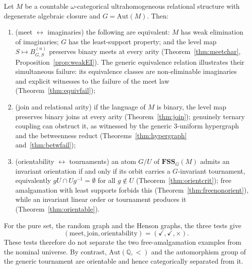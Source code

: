 \documentclass{lmcs}
\newcommand{\Aut}{\mathrm{Aut}}
\newcommand{\FSS}{\mathbf{FSS}}
\begin{document}
\begin{rem}\label{prop:dictionary}
Let $M$ be a countable $\omega$-categorical ultrahomogeneous relational
structure with degenerate algebraic closure and $G=\Aut(M)$. Then:
\begin{enumerate}[label=\textup{(\alph*)}]
\item \textup{(meet $\leftrightarrow$ imaginaries)} the following are
equivalent: $M$ has weak elimination of imaginaries; $G$ has the
least-support property; and the level map
$S\mapsto B^{(n)}_{G,S}$ preserves binary meets at every arity
\textup{(Theorem~\ref{thm:meetchar}, Proposition~\ref{prop:weakEI})}.
The generic equivalence relation illustrates their simultaneous
failure: its equivalence classes are non-eliminable imaginaries and
explicit witnesses to the failure of the meet law
\textup{(Theorem~\ref{thm:equivfail})};
\item \textup{(join and relational arity)} if the language of $M$
is binary, the level map preserves binary joins at every arity
\textup{(Theorem~\ref{thm:join})}; genuinely ternary coupling can
obstruct it, as witnessed by the generic $3$-uniform hypergraph and
the betweenness reduct
\textup{(Theorems~\ref{thm:hypergraph} and~\ref{thm:betwfail})};
\item \textup{(orientability $\leftrightarrow$ tournaments)} an atom
$G/U$ of $\FSS_G(M)$ admits an invariant orientation if and only if
its orbit carries a $G$-invariant tournament, equivalently
$gU\cap Ug^{-1}=\emptyset$ for all $g\notin U$
\textup{(Theorem~\ref{thm:orientcrit})}; free amalgamation with least
supports forbids this \textup{(Theorem~\ref{thm:freenonorient})},
while an invariant linear order or tournament produces it
\textup{(Theorem~\ref{thm:orientable})}.
\end{enumerate}
For the pure set, the random graph and the Henson graphs, the three tests give
\[
   (\text{meet},\text{join},\text{orientability})
   =(\checkmark,\checkmark,\times).
\]
These tests therefore do not separate the two free-amalgamation examples from the nominal universe. By contrast, $\Aut(\mathbb Q,<)$ and the automorphism group of the generic tournament are orientable and hence categorically separated from it.
\end{rem}
\end{document}
